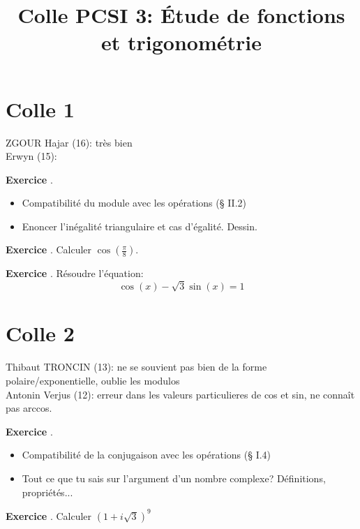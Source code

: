 \documentclass[10pt,a4paper]{article}
\title{Colle PCSI 3: Étude de fonctions et trigonométrie}
\newcounter{question}
\newcounter{exo}
\newenvironment{exo}{\vspace{0.5cm}\setcounter{question}{0}\addtocounter{exo}{1} \noindent \textbf{Exercice \theexo}. \normalsize }{\par}
\begin{document}
	\maketitle

	\section*{Colle 1}
	ZGOUR Hajar (16): très bien\\
	Erwyn (15):\\
	
	\begin{exo} 
		\begin{itemize}
			\item Compatibilité du module avec les opérations (§ II.2)
			\item Enoncer l'inégalité triangulaire et cas d'égalité. Dessin. 
		\end{itemize}
	\end{exo}
	
	\begin{exo}
		Calculer $\cos(\frac{\pi}{8})$.
	\end{exo}
	
	\begin{exo}
		Résoudre l'équation:
		$$\cos(x) - \sqrt{3} \sin(x) = 1$$
	\end{exo}

	\section*{Colle 2}
	\setcounter{exo}{0}
	Thibaut TRONCIN (13): ne se souvient pas bien de la forme polaire/exponentielle, oublie les modulos\\
	Antonin Verjus (12): erreur dans les valeurs particulieres de cos et sin, ne connaît pas arccos.\\
	
	\begin{exo}
		\begin{itemize}
			\item Compatibilité de la conjugaison avec les opérations (§ I.4)
			\item Tout ce que tu sais sur l'argument d'un nombre complexe? Définitions, propriétés...
		\end{itemize}
	\end{exo}

	\begin{exo}
		Calculer $(1 + i\sqrt{3})^9$
	\end{exo}
	
\end{document}
